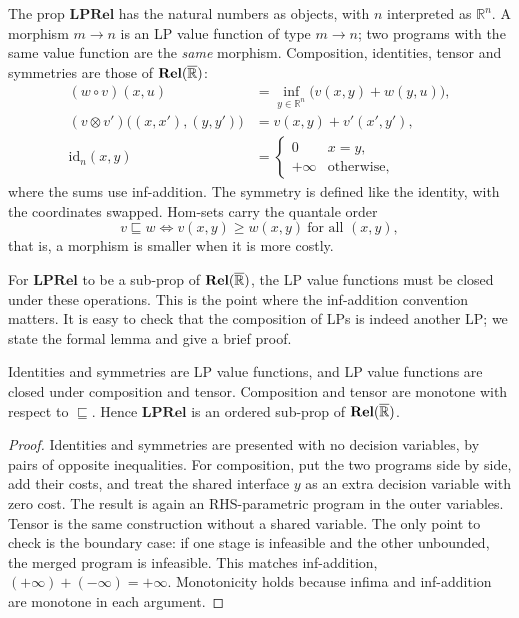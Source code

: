 \begin{definition}\label{def:lprel}
    The prop $\mathbf{LPRel}$ has the natural numbers as objects, with
    $n$ interpreted as $\mathbb{R}^n$. A morphism $m\to n$ is an LP
    value function of type $m\to n$; two programs with the same value
    function are the \emph{same} morphism. Composition, identities,
    tensor and symmetries are those of $\mathbf{Rel}(\overline{\mathbb{R}})$:
    \begin{align*}
        (w\circ v)(x,u) &= \inf_{y\in\mathbb{R}^n}\bigl(v(x,y)+w(y,u)\bigr),\\
        (v\otimes v')\bigl((x,x'),(y,y')\bigr) &= v(x,y)+v'(x',y'),\\
        \mathrm{id}_n(x,y) &=
        \begin{cases}0 & x=y,\\ +\infty & \text{otherwise},\end{cases}
    \end{align*}
    where the sums use inf-addition. The symmetry is defined like the
    identity, with the coordinates swapped. Hom-sets carry the quantale order
    \[
        v\sqsubseteq w \iff v(x,y)\ge w(x,y)\ \text{for all }(x,y),
    \]
    that is, a morphism is smaller when it is more costly.
\end{definition}

For $\mathbf{LPRel}$ to be a sub-prop of $\mathbf{Rel}(\overline{\mathbb{R}})$, the
LP value functions must be closed under these operations. This is the
point where the inf-addition convention matters. It is easy to check that
the composition of LPs is indeed another LP; we state the formal lemma
and give a brief proof.

\begin{lemma}[Closure]\label{lem:lprel-closure}
    Identities and symmetries are LP value functions, and LP value
    functions are closed under composition and tensor. Composition and
    tensor are monotone with respect to $\sqsubseteq$. Hence
    $\mathbf{LPRel}$ is an ordered sub-prop of $\mathbf{Rel}(\overline{\mathbb{R}})$.
\end{lemma}

\begin{proof}
    Identities and symmetries are presented with no decision variables,
    by pairs of opposite inequalities. For composition, put the two
    programs side by side, add their costs, and treat the shared
    interface $y$ as an extra decision variable with zero cost. The
    result is again an RHS-parametric program in the outer variables.
    Tensor is the same construction without a shared variable. The only
    point to check is the boundary case: if one stage is infeasible and
    the other unbounded, the merged program is infeasible. This matches
    inf-addition, $(+\infty)+(-\infty)=+\infty$. Monotonicity holds
    because infima and inf-addition are monotone in each argument.
\end{proof}

